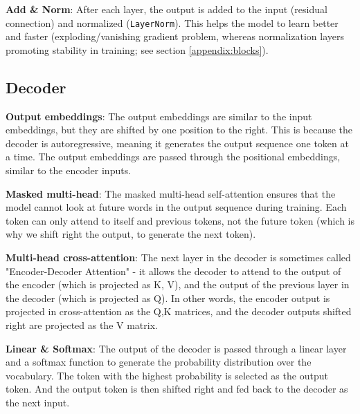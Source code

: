 \textbf{Add \& Norm}: After each layer, the output is added to the input (residual connection) and normalized (\texttt{LayerNorm}). This helps the model to learn better and faster (exploding/vanishing gradient problem, whereas normalization layers promoting stability in training; see section \ref{appendix:blocks}).

\subsection*{Decoder}

\textbf{Output embeddings}: The output embeddings are similar to the input embeddings, but they are shifted by one position to the right. This is because the decoder is autoregressive, meaning it generates the output sequence one token at a time. The output embeddings are passed through the positional embeddings, similar to the encoder inputs.

\textbf{Masked multi-head}: The masked multi-head self-attention ensures that the model cannot look at future words in the output sequence during training. Each token can only attend to itself and previous tokens, not the future token (which is why we shift right the output, to generate the next token).

\textbf{Multi-head cross-attention}: The next layer in the decoder is sometimes called "Encoder-Decoder Attention" - it allows the decoder to attend to the output of the encoder (which is projected as K, V), and the output of the previous layer in the decoder (which is projected as Q). In other words, the encoder output is projected in cross-attention as the Q,K matrices, and the decoder outputs shifted right are projected as the V matrix.

\textbf{Linear \& Softmax}: The output of the decoder is passed through a linear layer and a softmax function to generate the probability distribution over the vocabulary. The token with the highest probability is selected as the output token. And the output token is then shifted right and fed back to the decoder as the next input.